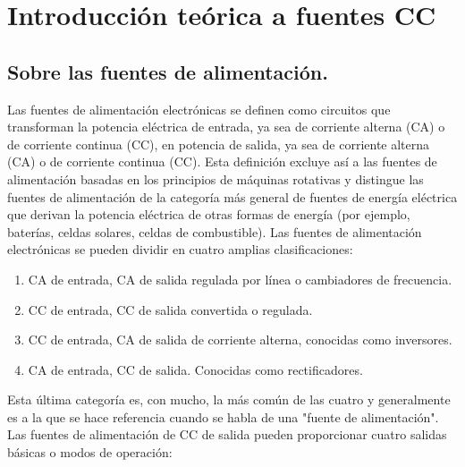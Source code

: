 \chapter{Introducción teórica a fuentes CC}

\label{C:Fuentes de corriente continua}

\section{Sobre las fuentes de alimentación.} \par
Las fuentes de alimentación electrónicas se definen como circuitos que transforman la potencia eléctrica de entrada, ya sea de corriente alterna (CA) o de corriente continua (CC), en potencia de salida, ya sea de corriente alterna (CA) o de corriente continua (CC). Esta definición excluye así a las fuentes de alimentación basadas en los principios de máquinas rotativas y distingue las fuentes de alimentación de la categoría más general de fuentes de energía eléctrica que derivan la potencia eléctrica de otras formas de energía (por ejemplo, baterías, celdas solares, celdas de combustible). Las fuentes de alimentación electrónicas se pueden dividir en cuatro amplias clasificaciones:

\begin{enumerate}
    \item CA de entrada, CA de salida regulada por línea o cambiadores de frecuencia.
    \item CC de entrada, CC de salida convertida o regulada.
    \item CC de entrada, CA de salida de corriente alterna, conocidas como inversores.
    \item CA de entrada, CC de salida. Conocidas como rectificadores.
\end{enumerate}

Esta última categoría es, con mucho, la más común de las cuatro y generalmente es a la que se hace referencia cuando se habla de una "fuente de alimentación". Las fuentes de alimentación de CC de salida pueden proporcionar cuatro salidas básicas o modos de operación:

